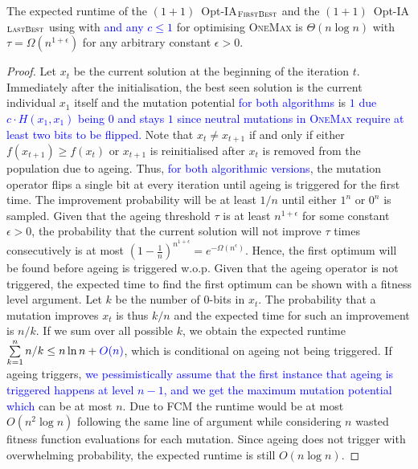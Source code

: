 \documentclass[lettersize,journal]{IEEEtran}
\newcommand{\new}[1]{\textcolor{blue}{#1}}
\begin{document}
\begin{theorem} \label{thm:onemaxexpo}
The expected runtime of the $(1+1)$~Opt-IA$_{\textsc{FirstBest}}$ and the $(1+1)$~Opt-IA$_{\textsc{LastBest}}$ using \IPHfcm{}  %
with {\linHD } \new{and any $c\leq 1$} for optimising
\textsc{OneMax} is $\Theta(n\log n)$ with $\tau=\Omega(n^{1+\epsilon})$ for any arbitrary constant $\epsilon>0$.
\end{theorem}
\begin{proof}
Let $x_t$ be the current solution at the beginning of the iteration $t$. Immediately after the initialisation, the best seen solution is the current individual $x_1$ itself and the mutation potential \new{for both algorithms} is %
\textcolor{blue}{$1$ due $c\cdot H(x_1,x_1)$ being $0$ and stays $1$ since neutral mutations in \textsc{OneMax} require at least two bits to be flipped.} Note that  $x_t \neq x_{t+1}$ if and only if either $f(x_{t+1})\geq f(x_t)$ or $x_{t+1}$ is reinitialised after $x_t$ is removed from the population due to ageing. Thus, \new{for both algorithmic versions}, the mutation operator flips a single bit at every iteration until ageing is triggered for the first time.
The improvement probability will be at least $ 1/n $ until either $1^n$ or $0^n$ is sampled. 
Given that the ageing threshold $\tau$  is at least $n^{1+\epsilon}$ for some constant $\epsilon >0 $, 
the probability that the current solution will not improve $\tau$ times consecutively is at most 
$(1-\frac{1}{n})^{n^{1+\epsilon}}=e^{-\Omega(n^\epsilon)}$. 
Hence, the first optimum will be found before ageing is triggered w.o.p. Given that the ageing operator is not triggered, the expected time to find the first optimum can be shown with a fitness level argument. Let $k$ be the number of $0$-bits in $x_t$. The probability that a mutation improves $x_t$ is thus $k/n$ and the expected time for such an improvement is $n/k$. If we sum over all possible $k$, we obtain the expected runtime $\sum\limits_{k=1}^{n}n/k \leq n \ln n + {\color{blue}O(n) } $, which is conditional on ageing not being triggered. If ageing triggers, \new{we pessimistically assume that the first instance that ageing is triggered happens at level $n-1$, and we get the maximum mutation potential which} can be at most $n$. Due to FCM the runtime would be at most $O(n^2 \log n)$ following the same line of argument while considering $n$ wasted fitness function evaluations for each mutation. %
Since ageing does not trigger with overwhelming probability, the expected runtime is still $O(n \log{n})$.


\end{proof}
\end{document}
